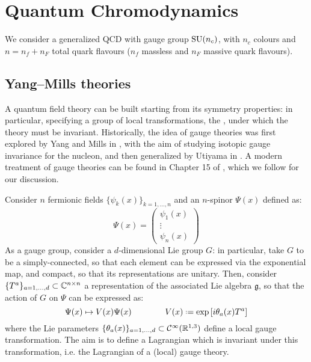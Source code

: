 
\section{Quantum Chromodynamics}
We consider a generalized QCD with gauge group $ \mathrm{SU}(n_c) $, with $ n_c $ colours and $ n = n_f + n_F $ total quark flavours ($ n_f $ massless and $ n_F $ massive quark flavours).

\subsection{Yang--Mills theories}
\label{ssec:gauge-th}

A quantum field theory can be built starting from its symmetry properties: in particular, specifying a group of local transformations, the , under which the theory must be invariant. Historically, the idea of gauge theories was first explored by Yang and Mills in \cite{Yang-1954}, with the aim of studying isotopic gauge invariance for the nucleon, and then generalized by Utiyama in \cite{Utiyama-1956}. A modern treatment of gauge theories can be found in Chapter 15 of \cite{Peskin-1995}, which we follow for our discussion.

Consider $ n $ fermionic fields $ \{\psi_k(x)\}_{k = 1, \dots, n} $ and an $ n $-spinor $ \Psi(x) $ defined as:
\begin{equation}
  \Psi(x) =
  \begin{pmatrix}
    \psi_1(x) \\ \vdots \\ \psi_n(x)
  \end{pmatrix}
\end{equation}
As a gauge group, consider a $ d $-dimensional Lie group $ G $: in particular, take $ G $ to be a simply-connected, so that each element can be expressed via the exponential map, and compact, so that its representations are unitary. Then, consider $ \{T^a\}_{a = 1, \dots, d} \subset \mathbb{C}^{n \times n} $ a representation of the associated Lie algebra $ \mathfrak{g} $, so that the action of $ G $ on $ \Psi $ can be expressed as:
\begin{equation}
  \Psi(x) \mapsto V(x) \Psi(x)
  \qquad \qquad
  V(x) \defeq \exp \left[ i \theta_a(x) T^a \right]
  \label{eq:gauge-trans}
\end{equation}
where the Lie parameters $ \{\theta_a(x)\}_{a = 1, \dots, d} \subset \mathcal{C}^\infty(\mathbb{R}^{1,3}) $ define a local gauge transformation. The aim is to define a Lagrangian which is invariant under this transformation, i.e. the Lagrangian of a (local) gauge theory.

